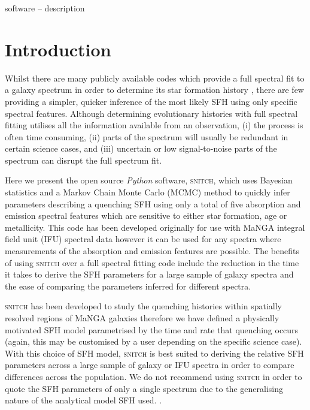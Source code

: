 \documentclass[useAMS,usenatbib]{mn2e}
\begin{document}
\begin{keywords}
software -- description
\end{keywords}

\section{Introduction}

Whilst there are many publicly available codes which provide a full spectral fit to a galaxy spectrum in order to determine its star formation history \citep[SFH;][]{cappellari04, cidfernandes05, ocvirk06, tojeiro07, noll09, conroy14, chevallard16, wilkinson17}, there are few providing a simpler, quicker inference of the most likely SFH using only specific spectral features. Although determining evolutionary histories with full spectral fitting utilises all the information available from an observation, (i) the process is often time consuming, (ii) parts of the spectrum will usually be redundant in certain science cases, and (iii) uncertain or low signal-to-noise parts of the spectrum can disrupt the full spectrum fit. 

Here we present the open source \emph{Python} software, \textsc{snitch}, which uses Bayesian statistics and a Markov Chain Monte Carlo (MCMC) method to quickly infer parameters describing a quenching SFH using only a total of five absorption and emission spectral features which are sensitive to either star formation, age or metallicity. This code has been developed originally for use with MaNGA integral field unit (IFU) spectral data however it can be used for any spectra where measurements of the absorption and emission features are possible. The benefits of using \textsc{snitch} over a full spectral fitting code include the reduction in the time it takes to derive the SFH parameters for a large sample of galaxy spectra and the ease of comparing the parameters inferred for different spectra.

\textsc{snitch} has been developed to study the quenching histories within spatially resolved regions of MaNGA galaxies therefore we have defined a physically motivated SFH model parametrised by the time and rate that quenching occurs (again, this may be customised by a user depending on the specific science case). With this choice of SFH model, \textsc{snitch} is best suited to deriving the relative SFH parameters across a large sample of galaxy or IFU spectra in order to compare differences across the population. We do not recommend using \textsc{snitch} in order to quote the SFH parameters of only a single spectrum due to the generalising nature of the analytical model SFH used. .  
\end{document}
